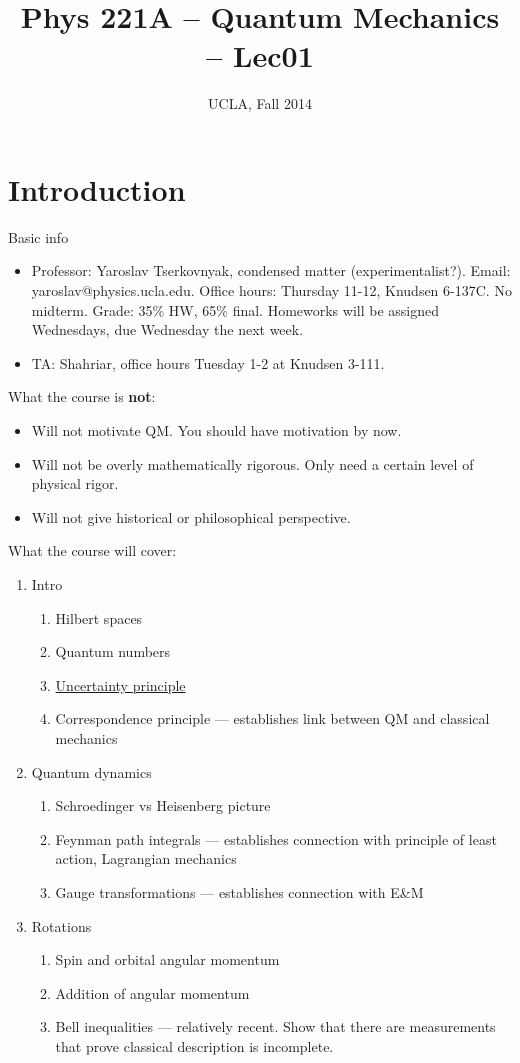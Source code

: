 \documentclass[12pt]{article} %
\title{Phys 221A -- Quantum Mechanics -- Lec01}
\author{UCLA, Fall 2014}
\date{\formatdate{06}{10}{2014}} %
\begin{document}
\maketitle


\section{Introduction}

Basic info
\begin{itemize}
\item Professor: Yaroslav Tserkovnyak, condensed matter (experimentalist?). Email: yaroslav@physics.ucla.edu. Office hours: Thursday 11-12, Knudsen 6-137C. No midterm. Grade: 35\% HW, 65\% final. Homeworks will be assigned Wednesdays, due Wednesday the next week. 
\item TA: Shahriar, office hours Tuesday 1-2 at Knudsen 3-111. 
\end{itemize}

What the course is \textbf{not}:
\begin{itemize}
\item Will not motivate QM. You should have motivation by now.
\item Will not be overly mathematically rigorous. Only need a certain level of physical rigor. 
\item Will not give historical or philosophical perspective. 
\end{itemize}

What the course will cover:
\begin{enumerate}
\item Intro
\begin{enumerate}
\item Hilbert spaces
\item Quantum numbers
\item \underline{Uncertainty principle}
\item Correspondence principle --- establishes link between QM and classical mechanics
\end{enumerate}
\item Quantum dynamics
\begin{enumerate}
\item Schroedinger vs Heisenberg picture
\item Feynman path integrals --- establishes connection with principle of least action, Lagrangian mechanics
\item Gauge transformations --- establishes connection with E\&M
\end{enumerate}
\item Rotations
\begin{enumerate}
\item Spin and orbital angular momentum
\item Addition of angular momentum
\item Bell inequalities --- relatively recent. Show that there are measurements that prove classical description is incomplete. 
\end{enumerate}
\end{enumerate}
\end{document}
